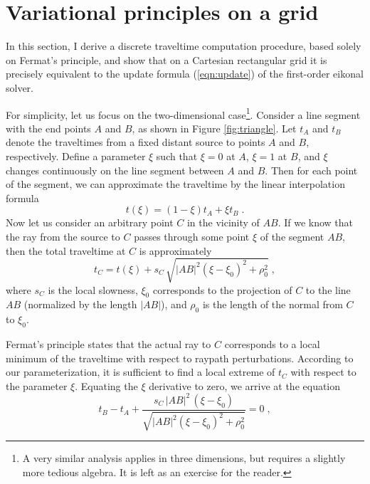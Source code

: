 \section{Variational principles on a grid}

In this section, I derive a discrete traveltime computation procedure,
based solely on Fermat's principle, and show that on a Cartesian
rectangular grid it is precisely equivalent to the update formula
(\ref{eqn:update}) of the first-order eikonal solver.

\par
For simplicity, let us focus on the two-dimensional case\footnote{A
  very similar analysis applies in three dimensions, but requires a
  slightly more tedious algebra. It is left as an exercise for the
  reader.}.  Consider a line segment with the end points $A$ and $B$,
as shown in Figure \ref{fig:triangle}. Let $t_A$ and $t_B$ denote the
traveltimes from a fixed distant source to points $A$ and $B$,
respectively. Define a parameter $\xi$ such that $\xi=0$ at $A$,
$\xi=1$ at $B$, and $\xi$ changes continuously on the line segment
between $A$ and $B$. Then for each point of the segment, we can
approximate the traveltime by the linear interpolation formula
\begin{equation}\label{eqn:linear}
  t (\xi) = (1-\xi) t_A + \xi t_B\;.
\end{equation}
Now let us consider an arbitrary point $C$ in the vicinity of $AB$. If
we know that the ray from the source to $C$ passes through some point
$\xi$ of the segment $AB$, then the total traveltime at $C$ is
approximately
\begin{equation}\label{eqn:tc}
  t_C = t (\xi) + s_C\,\sqrt{|AB|^2 (\xi-\xi_0)^2 +
  \rho_0^2}\;,
\end{equation}
where $s_C$ is the local slowness, $\xi_0$ corresponds to the
projection of $C$ to the line $AB$ (normalized by the length $|AB|$),
and $\rho_0$ is the length of the normal from $C$ to $\xi_0$.
\par
Fermat's principle states that the actual ray to $C$ corresponds to a
local minimum of the traveltime with respect to raypath perturbations.
According to our parameterization, it is sufficient to find a local
extreme of $t_C$ with respect to the parameter $\xi$.  Equating the
$\xi$ derivative to zero, we arrive at the equation
\begin{equation}\label{eqn:fermat}
 t_B - t_A + \frac{s_C\,|AB|^2\,(\xi-\xi_0)}
 {\sqrt{|AB|^2 (\xi-\xi_0)^2 + \rho_0^2}} = 0\;,
\end{equation}
